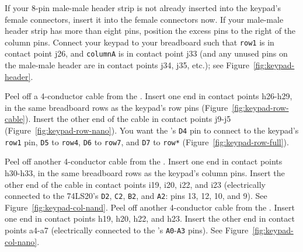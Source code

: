 If your 8-pin male-male header strip is not already inserted into the keypad's
female connectors, insert it into the female connectors now. If your male-male
header strip has more than eight pins, position the excess pins to the right of
the column pins. Connect your keypad to your breadboard such that \texttt{row1}
is in contact point j26, and \texttt{columnA} is in contact point j33 (and any
unused pins on the male-male header are in contact points j34, j35, etc.); see
Figure~\ref{fig:keypad-header}.

Peel off a 4-conductor cable from the \rainbow. Insert one end in contact
points h26-h29, in the same breadboard rows as the keypad's row pins
(Figure~\ref{fig:keypad-row-cable}). Insert the other end of the cable in
contact points j9-j5 (Figure~\ref{fig:keypad-row-nano}). You want the \nano's
\texttt{D4} pin to connect to the keypad's \texttt{row1} pin, \texttt{D5} to
\texttt{row4}, \texttt{D6} to \texttt{row7}, and \texttt{D7} to \texttt{row*}
(Figure~\ref{fig:keypad-row-full}).

Peel off another 4-conductor cable from the \rainbow. Insert one end in contact
points h30-h33, in the same breadboard rows as the keypad's column pins. Insert
the other end of the cable in contact points i19, i20, i22, and i23
(electrically connected to the 74LS20's \texttt{D2}, \texttt{C2}, \texttt{B2},
and \texttt{A2}: pins 13, 12, 10, and 9). See
Figure~\ref{fig:keypad-col-nand}. Peel off another 4-conductor cable from
the \rainbow. Insert one end in contact points h19, h20, h22, and h23. Insert
the other end in contact points a4-a7 (electrically connected to the \nano's
\texttt{A0}-\texttt{A3} pins). See Figure~\ref{fig:keypad-col-nano}.

